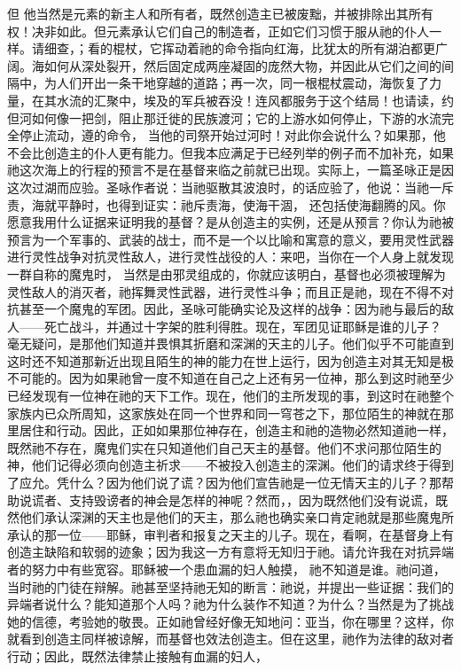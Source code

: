 但  他当然是元素的新主人和所有者，既然创造主已被废黜，并被排除出其所有权！决非如此。但元素承认它们自己的制造者，正如它们习惯于服从祂的仆人一样。请细查，；看的棍杖，它挥动着祂的命令指向红海，比犹太的所有湖泊都更广阔。海如何从深处裂开，然后固定成两座凝固的庞然大物，并因此从它们之间的间隔中，为人们开出一条干地穿越的道路；再一次，同一根棍杖震动，海恢复了力量，在其水流的汇聚中，埃及的军兵被吞没！连风都服务于这个结局！也请读，约但河如何像一把剑，阻止那迁徙的民族渡河；它的上游水如何停止，下游的水流完全停止流动，遵的命令， 当他的司祭开始过河时！对此你会说什么？如果那，他不会比创造主的仆人更有能力。但我本应满足于已经列举的例子而不加补充，如果祂这次海上的行程的预言不是在基督来临之前就已出现。实际上，一篇圣咏正是因这次过湖而应验。圣咏作者说：当祂驱散其波浪时，的话应验了，他说：当祂一斥责，海就平静时，也得到证实：祂斥责海，使海干涸， 还包括使海翻腾的风。你愿意我用什么证据来证明我的基督？是从创造主的实例，还是从预言？你认为祂被预言为一个军事的、武装的战士，而不是一个以比喻和寓意的意义，要用灵性武器进行灵性战争对抗灵性敌人，进行灵性战役的人：来吧，当你在一个人身上就发现一群自称的魔鬼时， 当然是由邪灵组成的，你就应该明白，基督也必须被理解为灵性敌人的消灭者，祂挥舞灵性武器，进行灵性斗争；而且正是祂，现在不得不对抗甚至一个魔鬼的军团。因此，圣咏可能确实论及这样的战争：因为祂与最后的敌人——死亡战斗，并通过十字架的胜利得胜。现在，军团见证耶稣是谁的儿子？ 毫无疑问，是那他们知道并畏惧其折磨和深渊的天主的儿子。他们似乎不可能直到这时还不知道那新近出现且陌生的神的能力在世上运行，因为创造主对其无知是极不可能的。因为如果祂曾一度不知道在自己之上还有另一位神，那么到这时祂至少已经发现有一位神在祂的天下工作。现在，他们的主所发现的事，到这时在祂整个家族内已众所周知，这家族处在同一个世界和同一穹苍之下，那位陌生的神就在那里居住和行动。因此，正如如果那位神存在，创造主和祂的造物必然知道祂一样，既然祂不存在，魔鬼们实在只知道他们自己天主的基督。他们不求问那位陌生的神，他们记得必须向创造主祈求——不被投入创造主的深渊。他们的请求终于得到了应允。凭什么？因为他们说了谎？因为他们宣告祂是一位无情天主的儿子？那帮助说谎者、支持毁谤者的神会是怎样的神呢？然而，，因为既然他们没有说谎，既然他们承认深渊的天主也是他们的天主，那么祂也确实亲口肯定祂就是那些魔鬼所承认的那一位——耶稣，审判者和报复之天主的儿子。现在，看啊，在基督身上有创造主缺陷和软弱的迹象；因为我这一方有意将无知归于祂。请允许我在对抗异端者的努力中有些宽容。耶稣被一个患血漏的妇人触摸， 祂不知道是谁。祂问道，当时祂的门徒在辩解。祂甚至坚持祂无知的断言：祂说，并提出一些证据：我们的异端者说什么？能知道那个人吗？祂为什么装作不知道？为什么？当然是为了挑战她的信德，考验她的敬畏。正如祂曾经好像无知地问：亚当，你在哪里？这样，你就看到创造主同样被谅解，而基督也效法创造主。但在这里，祂作为法律的敌对者行动；因此，既然法律禁止接触有血漏的妇人， 
